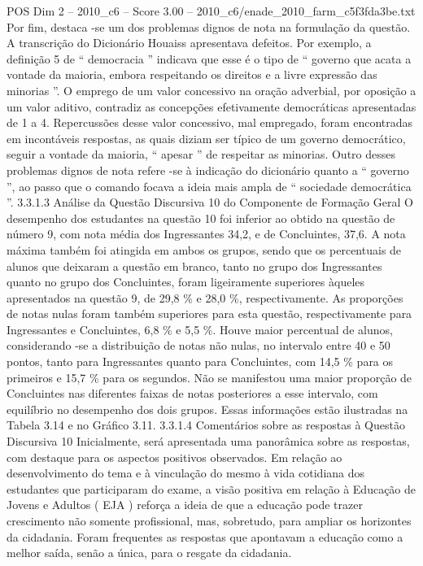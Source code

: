 \begin{textsample}{POS Dim 2 – 2010\_c6 – Score 3.00 – 2010\_c6/enade\_2010\_farm\_c5f3fda3be.txt}
Por fim, destaca -se um dos problemas dignos de nota na formulação da questão.
A transcrição do Dicionário Houaiss apresentava defeitos.
Por exemplo, a definição 5 de “ democracia ” indicava que esse é o tipo de “ governo que acata a vontade da maioria, embora respeitando os direitos e a livre expressão das minorias ”.
O emprego de um valor concessivo na oração adverbial, por oposição a um valor aditivo, contradiz as concepções efetivamente democráticas apresentadas de 1 a 4.
Repercussões desse valor concessivo, mal empregado, foram encontradas em incontáveis respostas, as quais diziam ser típico de um governo democrático, seguir a vontade da maioria, “ apesar ” de respeitar as minorias.
Outro desses problemas dignos de nota refere -se à indicação do dicionário quanto a “ governo ”, ao passo que o comando focava a ideia mais ampla de “ sociedade democrática ”. 3.3.1.3 Análise da Questão Discursiva 10 do Componente de Formação Geral O desempenho dos estudantes na questão 10 foi inferior ao obtido na questão de número 9, com nota média dos Ingressantes 34,2, e de Concluintes, 37,6.
A nota máxima também foi atingida em ambos os grupos, sendo que os percentuais de alunos que deixaram a questão em branco, tanto no grupo dos Ingressantes quanto no grupo dos Concluintes, foram ligeiramente superiores àqueles apresentados na questão 9, de 29,8 \% e 28,0 \%, respectivamente.
As proporções de notas nulas foram também superiores para esta questão, respectivamente para Ingressantes e Concluintes, 6,8 \% e 5,5 \%.
Houve maior percentual de alunos, considerando -se a distribuição de notas não nulas, no intervalo entre 40 e 50 pontos, tanto para Ingressantes quanto para Concluintes, com 14,5 \% para os primeiros e 15,7 \% para os segundos.
Não se manifestou uma maior proporção de Concluintes nas diferentes faixas de notas posteriores a esse intervalo, com equilíbrio no desempenho dos dois grupos.
Essas informações estão ilustradas na Tabela 3.14 e no Gráfico 3.11. 3.3.1.4 Comentários sobre as respostas à Questão Discursiva 10 Inicialmente, será apresentada uma panorâmica sobre as respostas, com destaque para os aspectos positivos observados.
Em relação ao desenvolvimento do tema e à vinculação do mesmo à vida cotidiana dos estudantes que participaram do exame, a visão positiva em relação à Educação de Jovens e Adultos ( EJA ) reforça a ideia de que a educação pode trazer crescimento não somente profissional, mas, sobretudo, para ampliar os horizontes da cidadania.
Foram frequentes as respostas que apontavam a educação como a melhor saída, senão a única, para o resgate da cidadania.

\end{textsample}
